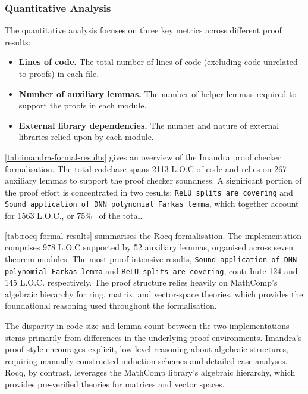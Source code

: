 \subsubsection{Quantitative Analysis} \label{sec:quantitative-analysis}

The quantitative analysis focuses on three key metrics across different proof results:

\begin{itemize}
    \item \textbf{Lines of code.} The total number of lines of code (excluding code unrelated to proofs) in each file.
    \item \textbf{Number of auxiliary lemmas.} The number of helper lemmas required to support the proofs in each module.
    \item \textbf{External library dependencies.} The number and nature of external libraries relied upon by each module.
\end{itemize}

\autoref{tab:imandra-formal-results} gives an overview of the Imandra proof checker formalisation. The total codebase spans 2113 L.O.C of code and relies on 267 auxiliary lemmas to support the proof checker soundness. A significant portion of the proof effort is concentrated in two results: \texttt{ReLU splits are covering} and \texttt{Sound application of DNN polynomial Farkas lemma}, which together account for 1563 L.O.C., or 75\%~ of the total.

\autoref{tab:rocq-formal-results} summarises the Rocq formalisation. The implementation comprises 978 L.O.C supported by 52 auxiliary lemmas, organised across seven theorem modules. The most proof-intensive results, \texttt{Sound application of DNN polynomial Farkas lemma} and \texttt{ReLU splits are covering}, contribute 124 and 145 L.O.C. respectively. The proof structure relies heavily on MathComp's algebraic hierarchy for ring, matrix, and vector-space theories, which provides the foundational reasoning used throughout the formalisation.

The disparity in code size and lemma count between the two implementations stems primarily from differences in the underlying proof environments. Imandra's proof style encourages explicit, low-level reasoning about algebraic structures, requiring manually constructed induction schemes and detailed case analyses. Rocq, by contrast, leverages the MathComp library's algebraic hierarchy, which provides pre-verified theories for matrices and vector spaces.

